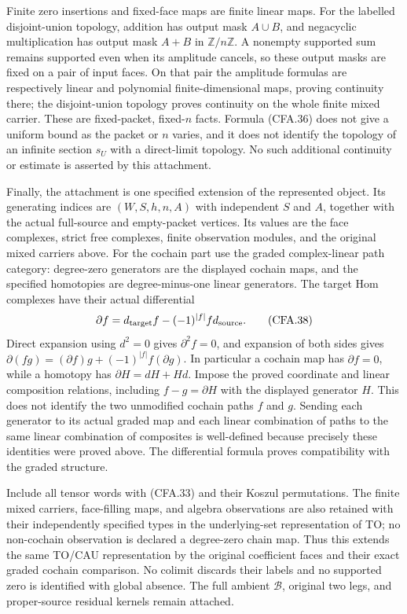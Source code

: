 Finite zero insertions and fixed-face maps are finite linear maps.
For the labelled disjoint-union topology, addition has output mask
$A\cup B$, and negacyclic multiplication has output mask $A+B$
in $\mathbb Z/n\mathbb Z$.  A nonempty supported sum remains
supported even when its amplitude cancels, so these output masks
are fixed on a pair of input faces.  On that pair the amplitude
formulas are respectively linear and polynomial finite-dimensional
maps, proving continuity there; the disjoint-union topology proves
continuity on the whole finite mixed carrier.  These are fixed-packet,
fixed-$n$ facts.  Formula (CFA.36) does not give a uniform bound as
the packet or $n$ varies, and it does not identify the topology of an
infinite section $s_U$ with a direct-limit topology.  No such additional
continuity or estimate is asserted by this attachment.

Finally, the attachment is one specified extension of the represented
object.  Its generating indices are $(W,S,h,n,A)$ with independent
$S$ and $A$, together with the actual full-source and empty-packet
vertices.  Its values are the face complexes, strict free complexes,
finite observation modules, and the original mixed carriers above.
For the cochain part use the graded complex-linear path category:
degree-zero generators are the displayed cochain maps, and the
specified homotopies are degree-minus-one linear generators.
The target Hom complexes have their actual differential
\[
 \partial f=d_{\rm target}f-(-1)^{|f|}f d_{\rm source}.
                                                               \tag{CFA.38}
\]
Direct expansion using $d^2=0$ gives $\partial^2f=0$, and expansion
of both sides gives
$\partial(fg)=(\partial f)g+(-1)^{|f|}f(\partial g)$.
In particular a cochain map has $\partial f=0$, while a homotopy
has $\partial H=dH+Hd$.  Impose the proved coordinate and linear
composition relations, including $f-g=\partial H$ with the displayed
generator $H$.  This does not identify the two unmodified cochain
paths $f$ and $g$.  Sending each generator to its actual graded map
and each linear combination of paths to the same linear combination
of composites is well-defined because precisely these identities
were proved above.  The differential formula proves compatibility
with the graded structure.

Include all tensor words with (CFA.33) and their Koszul permutations.
The finite mixed carriers, face-filling maps, and algebra observations
are also retained with their independently specified types in the
underlying-set representation of TO; no non-cochain observation is
declared a degree-zero chain map.  Thus this extends the same TO/CAU
representation by the original coefficient faces and their exact
graded cochain comparison.  No colimit discards their labels and no
supported zero is identified with global absence.  The full ambient
$\mathscr B$, original two legs, and proper-source residual kernels
remain attached.
